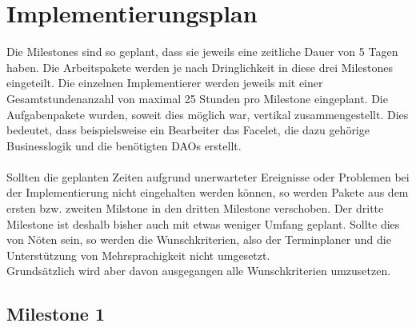\newcommand{\kursiv}[1]{{\it #1}}
\chapter{Implementierungsplan}
Die Milestones sind so geplant, dass sie jeweils eine zeitliche Dauer von 5 Tagen haben. Die Arbeitspakete werden
je nach Dringlichkeit in diese drei Milestones eingeteilt. Die einzelnen Implementierer werden jeweils
mit einer Gesamtstundenanzahl von maximal 25 Stunden pro Milestone eingeplant. Die Aufgabenpakete wurden, soweit dies möglich war, vertikal zusammengestellt.
Dies bedeutet, dass beispielsweise ein Bearbeiter das Facelet, die dazu
gehörige Businesslogik und die benötigten DAOs erstellt.\\
\ \\
Sollten die geplanten Zeiten aufgrund unerwarteter Ereignisse oder Problemen bei der Implementierung nicht eingehalten werden können, so werden Pakete aus dem
ersten bzw. zweiten Milstone in den dritten Milestone verschoben. Der dritte Milestone ist deshalb bisher auch mit etwas weniger Umfang geplant.
Sollte dies von Nöten sein, so werden die Wunschkriterien, also der Terminplaner und die Unterstützung von Mehrsprachigkeit nicht umgesetzt.\\
Grundsätzlich wird aber davon ausgegangen alle Wunschkriterien umzusetzen.
\section{Milestone 1}


